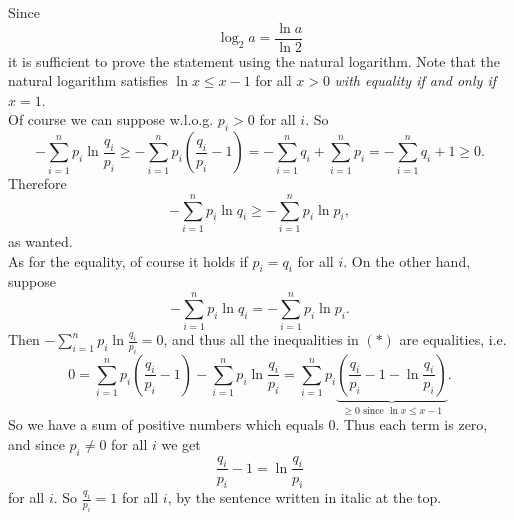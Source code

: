 \documentclass[12pt,a4paper]{report}
\theoremstyle{definition}
\theoremstyle{num.custom-title}
\renewcommand{\1}{\mathbbm{1}}
\begin{document}
Since
\[
\log_2 a = \frac{ \ln a }{ \ln 2 }
\]
it is sufficient to prove the statement using the natural logarithm. Note that the natural logarithm satisfies $\ln x \leq x-1$ for all $x > 0$ \emph{with equality if and only if $x=1$}.\\
Of course we can suppose w.l.o.g. $p_i>0$ for all $i$.
So
\[
- \sum_{i=1}^n p_i \ln \frac{q_i}{p_i}  \geq  - \sum_{i=1}^n p_i \left( \frac{q_i}{p_i} - 1 \right) 
=  - \sum_{i=1}^n q_i + \sum_{i=1}^n p_i  
 =  - \sum_{i=1}^n q_i + 1 \geq  0. \tag{$*$}
\]
Therefore
\[
- \sum_{i=1}^n p_i \ln q_i \geq - \sum_{i=1}^n p_i \ln p_i,
\]
as wanted.\\
As for the equality, of course it holds if $p_i = q_i$ for all $i$. On the other hand, suppose
\[
- \sum_{i=1}^n p_i \ln q_i = - \sum_{i=1}^n p_i \ln p_i.
\]
Then $- \sum_{i=1}^n p_i \ln \frac{q_i}{p_i} =0$, and thus all the inequalities in $(*)$ are equalities, i.e.
\[
0 = \sum_{i=1}^n p_i \left( \frac{q_i}{p_i} - 1 \right) - \sum_{i=1}^n p_i \ln \frac{q_i}{p_i}
= \sum_{i=1}^n p_i \underbrace{\left( \frac{q_i}{p_i} - 1 - \ln \frac{q_i}{p_i} \right)}_{\geq 0 \text{ since } \ln x \leq x-1}.
\]
So we have a sum of positive numbers which equals $0$. Thus each term is zero, and since $p_i \neq 0$ for all $i$ we get
\[
\frac{q_i}{p_i} - 1 = \ln \frac{q_i}{p_i}
\]
for all $i$. So $\frac{q_i}{p_i}=1$ for all $i$, by the sentence written in italic at the top.
\end{document}
